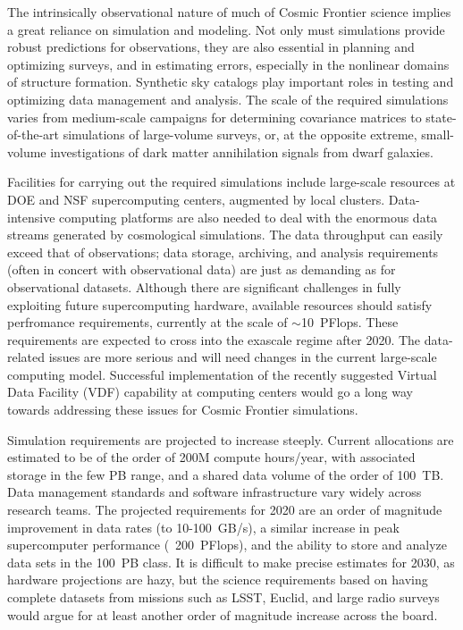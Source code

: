 The intrinsically observational nature of much of Cosmic Frontier
science implies a great reliance on simulation and modeling. Not only
must simulations provide robust predictions for observations, they are
also essential in planning and optimizing surveys, and in estimating
errors, especially in the nonlinear domains of structure
formation. Synthetic sky catalogs play important roles in testing and
optimizing data management and analysis. The scale of the required
simulations varies from medium-scale campaigns for determining
covariance matrices to state-of-the-art simulations of large-volume
surveys, or, at the opposite extreme, small-volume investigations of
dark matter annihilation signals from dwarf galaxies.

Facilities for carrying out the required simulations include
large-scale resources at DOE and NSF supercomputing centers, augmented
by local clusters. Data-intensive computing platforms are also needed
to deal with the enormous data streams generated by cosmological
simulations. The data throughput can easily exceed that of
observations; data storage, archiving, and analysis requirements
(often in concert with observational data) are just as demanding as
for observational datasets. Although there are significant challenges
in fully exploiting future supercomputing hardware, available
resources should satisfy perfromance requirements, currently at the
scale of $\sim$10~PFlops. These requirements are expected to cross into
the exascale regime after 2020. The data-related issues are more
serious and will need changes in the current large-scale computing
model. Successful implementation of the recently suggested Virtual
Data Facility (VDF) capability at computing centers would go a long
way towards addressing these issues for Cosmic Frontier simulations.

Simulation requirements are projected to increase steeply. Current
allocations are estimated to be of the order of 200M compute
hours/year, with associated storage in the few PB range, and a shared
data volume of the order of 100~TB. Data management standards and
software infrastructure vary widely across research teams. The
projected requirements for 2020 are an order of magnitude improvement
in data rates (to 10-100~GB/s), a similar increase in peak
supercomputer performance (~200~PFlops), and the ability to store and
analyze data sets in the 100~PB class. It is difficult to make precise
estimates for 2030, as hardware projections are hazy, but the
science requirements based on having complete datasets from missions
such as LSST, Euclid, and large radio surveys would argue for at least
another order of magnitude increase across the board.

